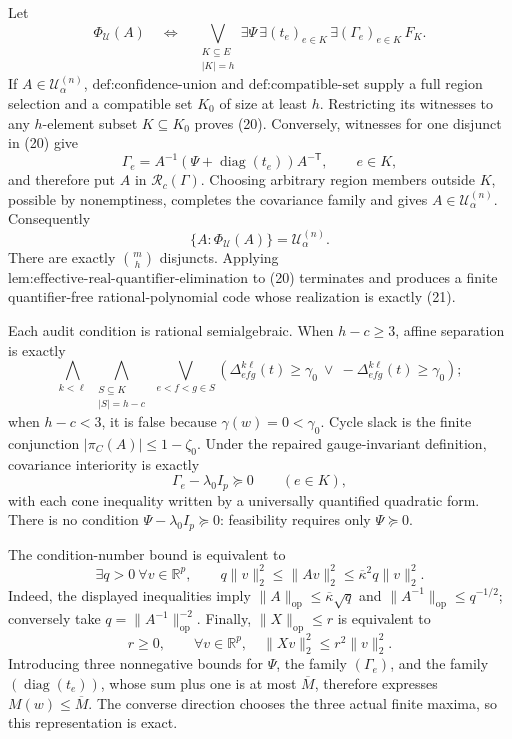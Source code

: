Let
\[
\Phi_{\mathcal U}(A)
\quad\Longleftrightarrow\quad
\bigvee_{\substack{K\subseteq E\\|K|=h}}
\exists\Psi\,\exists(t_e)_{e\in K}\,\exists(\Gamma_e)_{e\in K}\,F_K.
\tag{20}
\]
If \(A\in\mathcal U^{(n)}_\alpha\), \(\text{def:confidence-union}\) and \(\text{def:compatible-set}\) supply a full region selection and a compatible set \(K_0\) of size at least \(h\). Restricting its witnesses to any \(h\)-element subset \(K\subseteq K_0\) proves (20). Conversely, witnesses for one disjunct in (20) give
\[
\Gamma_e=A^{-1}(\Psi+\operatorname{diag}(t_e))A^{-\mathsf T},
\qquad e\in K,
\]
and therefore put \(A\) in \(\mathcal R_c(\Gamma)\). Choosing arbitrary region members outside \(K\), possible by nonemptiness, completes the covariance family and gives \(A\in\mathcal U^{(n)}_\alpha\). Consequently
\[
\{A:\Phi_{\mathcal U}(A)\}=\mathcal U^{(n)}_\alpha.
\tag{21}
\]
There are exactly \(\binom mh\) disjuncts. Applying \(\text{lem:effective-real-quantifier-elimination}\) to (20) terminates and produces a finite quantifier-free rational-polynomial code whose realization is exactly (21).

Each audit condition is rational semialgebraic. When \(h-c\geq3\), affine separation is exactly
\[
\bigwedge_{k<\ell}\ \bigwedge_{\substack{S\subseteq K\\|S|=h-c}}
\ \bigvee_{e<f<g\in S}
\left(\Delta^{k\ell}_{efg}(t)\geq\gamma_0
\ \vee\ -\Delta^{k\ell}_{efg}(t)\geq\gamma_0\right);
\]
when \(h-c<3\), it is false because \(\gamma(w)=0<\gamma_0\). Cycle slack is the finite conjunction \(|\pi_C(A)|\leq1-\zeta_0\). Under the repaired gauge-invariant definition, covariance interiority is exactly
\[
\Gamma_e-\lambda_0I_p\succeq0\qquad(e\in K),
\tag{22}
\]
with each cone inequality written by a universally quantified quadratic form. There is no condition \(\Psi-\lambda_0I_p\succeq0\): feasibility requires only \(\Psi\succeq0\).

The condition-number bound is equivalent to
\[
\exists q>0\ \forall v\in\mathbb R^p,\qquad
q\|v\|_2^2\leq\|Av\|_2^2
\leq\overline\kappa^2q\|v\|_2^2.
\]
Indeed, the displayed inequalities imply \(\|A\|_{\mathrm{op}}\leq\overline\kappa\sqrt q\) and \(\|A^{-1}\|_{\mathrm{op}}\leq q^{-1/2}\); conversely take \(q=\|A^{-1}\|_{\mathrm{op}}^{-2}\). Finally, \(\|X\|_{\mathrm{op}}\leq r\) is equivalent to
\[
r\geq0,
\qquad
\forall v\in\mathbb R^p,\quad \|Xv\|_2^2\leq r^2\|v\|_2^2.
\]
Introducing three nonnegative bounds for \(\Psi\), the family \((\Gamma_e)\), and the family \((\operatorname{diag}(t_e))\), whose sum plus one is at most \(\overline M\), therefore expresses \(M(w)\leq\overline M\). The converse direction chooses the three actual finite maxima, so this representation is exact.


